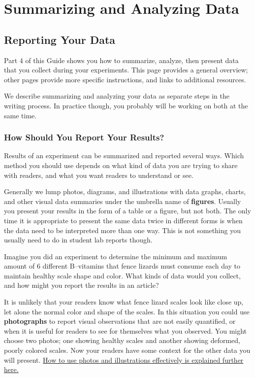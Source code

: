 \documentclass[
]{book}
\begin{document}
\hypertarget{part-summarizing-and-analyzing-data}{%
\part{Summarizing and Analyzing Data}\label{part-summarizing-and-analyzing-data}}

\hypertarget{datatypes400}{%
\chapter{Reporting Your Data}\label{datatypes400}}

Part 4 of this Guide shows you how to summarize, analyze, then present data that you collect during your experiments. This page provides a general overview; other pages provide more specific instructions, and links to additional resources.

We describe summarizing and analyzing your data as separate steps in the writing process. In practice though, you probably will be working on both at the same time.

\hypertarget{how-should-you-report-your-results}{%
\section{How Should You Report Your Results?}\label{how-should-you-report-your-results}}

Results of an experiment can be summarized and reported several ways. Which method you should use depends on what kind of data you are trying to share with readers, and what you want readers to understand or see.

Generally we lump photos, diagrams, and illustrations with data graphs, charts, and other visual data summaries under the umbrella name of \textbf{figures}. Usually you present your results in the form of a table or a figure, but not both. The only time it is appropriate to present the same data twice in different forms is when the data need to be interpreted more than one way. This is not something you usually need to do in student lab reports though.

Imagine you did an experiment to determine the minimum and maximum amount of 6 different B--vitamins that fence lizards must consume each day to maintain healthy scale shape and color. What kinds of data would you collect, and how might you report the results in an article?

It is unlikely that your readers know what fence lizard scales look like close up, let alone the normal color and shape of the scales. In this situation you could use \textbf{photographs} to report visual observations that are not easily quantified, or when it is useful for readers to see for themselves what you observed. You might choose two photos; one showing healthy scales and another showing deformed, poorly colored scales. Now your readers have some context for the other data you will present. \protect\hyperlink{photos430}{How to use photos and illustrations effectively is explained further here.}
\end{document}
